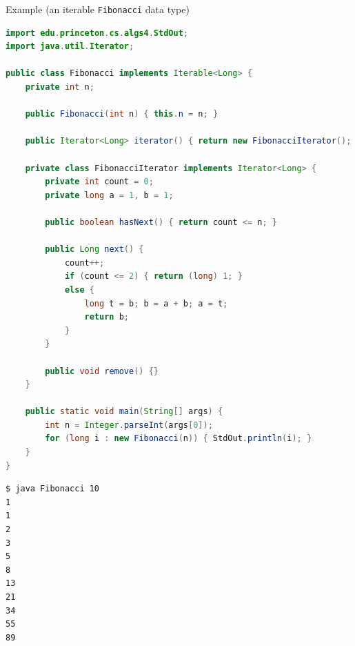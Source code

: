 \documentclass[8pt,a4paper,compress]{beamer}
\begin{document}
\begin{frame}[fragile]
Example (an iterable \lstinline{Fibonacci} data type)
\begin{lstlisting}[language=Java]
import edu.princeton.cs.algs4.StdOut;
import java.util.Iterator;

public class Fibonacci implements Iterable<Long> {
    private int n;

    public Fibonacci(int n) { this.n = n; }

    public Iterator<Long> iterator() { return new FibonacciIterator(); }

    private class FibonacciIterator implements Iterator<Long> {
        private int count = 0;
        private long a = 1, b = 1;

        public boolean hasNext() { return count <= n; }

        public Long next() {
            count++;
            if (count <= 2) { return (long) 1; }
            else { 
                long t = b; b = a + b; a = t;
                return b;
            }
        }
        
        public void remove() {}
    }

    public static void main(String[] args) {
        int n = Integer.parseInt(args[0]);
        for (long i : new Fibonacci(n)) { StdOut.println(i); }
    }
}
\end{lstlisting}
\end{frame}

\begin{frame}[fragile]
\begin{lstlisting}[language={}]
$ java Fibonacci 10
1
1
2
3
5
8
13
21
34
55
89
\end{lstlisting}
\end{frame}
\end{document}
